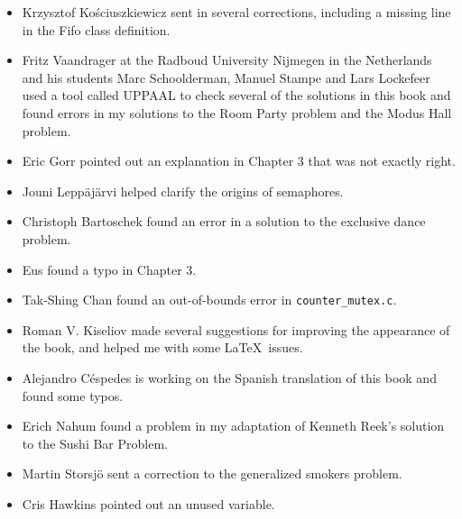 \documentclass{book}
\begin{document}
\begin{itemize}
\item Krzysztof Ko\'{s}ciuszkiewicz sent in several corrections, including
a missing line in the Fifo class definition.


\item Fritz Vaandrager at the Radboud University Nijmegen in the
Netherlands and his students Marc Schoolderman, Manuel Stampe and Lars
Lockefeer used a tool called UPPAAL to check several of the solutions
in this book and found errors in my solutions to the Room Party problem
and the Modus Hall problem.


\item Eric Gorr pointed out an explanation in Chapter 3 that was
not exactly right.


\item Jouni Lepp\"{a}j\"{a}rvi helped clarify the origins of semaphores.


\item Christoph Bartoschek found an error in a solution to
the exclusive dance problem.


\item Eus found a typo in Chapter 3.


\item Tak-Shing Chan found an out-of-bounds error in {\tt counter\_mutex.c}.


\item Roman V. Kiseliov made several suggestions for improving
the appearance of the book, and helped me with some \LaTeX~issues.


\item Alejandro C\'{e}spedes is working on the Spanish translation of this
book and found some typos.


\item Erich Nahum found a problem in my adaptation of Kenneth Reek's
  solution to the Sushi Bar Problem.


\item Martin Storsj\"{o} sent a correction to the generalized smokers problem.


\item Cris Hawkins pointed out an unused variable.


\end{itemize}
\end{document}
